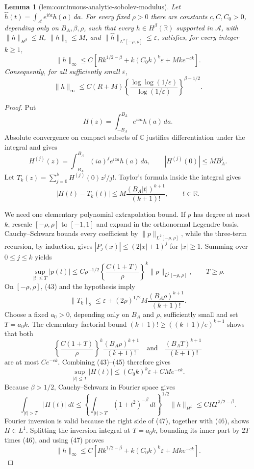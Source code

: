 \documentclass{article}
\newtheorem{lemma}{Lemma}
\begin{document}
\begin{lemma}[lem:continuous-analytic-sobolev-modulus]\label{lem:continuous-analytic-sobolev-modulus}
Let \(\widehat h(t)=\int_{\mathcal A}e^{ita}h(a)\,da\).  For every fixed \(\rho>0\) there are constants \(c,C,C_0>0\), depending only on \(B_A,\beta,\rho\), such that every \(h\in H^\beta(\mathbb R)\) supported in \(\mathcal A\), with \(\|h\|_{H^\beta}\le R\), \(\|h\|_1\le M\), and \(\|\widehat h\|_{L^2[-\rho,\rho]}\le\varepsilon\), satisfies, for every integer \(k\ge1\),
\[
 \|h\|_\infty\le C\left[Rk^{1/2-\beta}+k(C_0k)^k\varepsilon+Mk e^{-ck}\right].
\]
Consequently, for all sufficiently small \(\varepsilon\),
\[
 \|h\|_\infty\le C(R+M)\left\{\frac{\log\log(1/\varepsilon)}{\log(1/\varepsilon)}\right\}^{\beta-1/2}.
\]
\end{lemma}
\begin{proof}
Put
\[
H(z)=\int_{-B_A}^{B_A}e^{iza}h(a)\,da.
\]
Absolute convergence on compact subsets of \(\mathbb C\) justifies differentiation under the integral and gives
\[
H^{(j)}(z)=\int_{-B_A}^{B_A}(ia)^je^{iza}h(a)\,da,
\qquad |H^{(j)}(0)|\le MB_A^j. \tag{42}
\]
Let \(T_k(z)=\sum_{j=0}^kH^{(j)}(0)z^j/j!\).  Taylor's formula inside the integral gives
\[
|H(t)-T_k(t)|
\le M\frac{(B_A|t|)^{k+1}}{(k+1)!},
\qquad t\in\mathbb R. \tag{43}
\]

We need one elementary polynomial extrapolation bound.  If \(p\) has degree at most \(k\), rescale \([-\rho,\rho]\) to \([-1,1]\) and expand in the orthonormal Legendre basis.  Cauchy--Schwarz bounds every coefficient by \(\|p\|_{L^2[-\rho,\rho]}\), while the three-term recursion, by induction, gives \(|P_j(x)|\le(2|x|+1)^j\) for \(|x|\ge1\).  Summing over \(0\le j\le k\) yields
\[
\sup_{|t|\le T}|p(t)|
\le C\rho^{-1/2}
\left\{\frac{C(1+T)}{\rho}\right\}^k
\|p\|_{L^2[-\rho,\rho]},
\qquad T\ge\rho. \tag{44}
\]
On \([-\rho,\rho]\), (43) and the hypothesis imply
\[
\|T_k\|_2
\le\varepsilon+(2\rho)^{1/2}M
\frac{(B_A\rho)^{k+1}}{(k+1)!}. \tag{45}
\]
Choose a fixed \(a_0>0\), depending only on \(B_A\) and \(\rho\), sufficiently small and set \(T=a_0k\).  The elementary factorial bound \((k+1)!\ge((k+1)/e)^{k+1}\) shows that both
\[
\left\{\frac{C(1+T)}{\rho}\right\}^k
\frac{(B_A\rho)^{k+1}}{(k+1)!}
\quad\text{and}\quad
\frac{(B_AT)^{k+1}}{(k+1)!}
\]
are at most \(Ce^{-ck}\).  Combining (43)--(45) therefore gives
\[
\sup_{|t|\le T}|H(t)|
\le (C_0k)^k\varepsilon+CMe^{-ck}. \tag{46}
\]
Because \(\beta>1/2\), Cauchy--Schwarz in Fourier space gives
\[
\int_{|t|>T}|H(t)|\,dt
\le
\left\{\int_{|t|>T}(1+t^2)^{-\beta}\,dt\right\}^{1/2}
\|h\|_{H^\beta}
\le CRT^{1/2-\beta}. \tag{47}
\]
Fourier inversion is valid because the right side of (47), together with (46), shows \(H\in L^1\).  Splitting the inversion integral at \(T=a_0k\), bounding its inner part by \(2T\) times (46), and using (47) proves
\[
\|h\|_\infty
\le C\left[Rk^{1/2-\beta}
+k(C_0k)^k\varepsilon+Mk e^{-ck}\right]. \tag{48}
\]


\end{proof}
\end{document}
